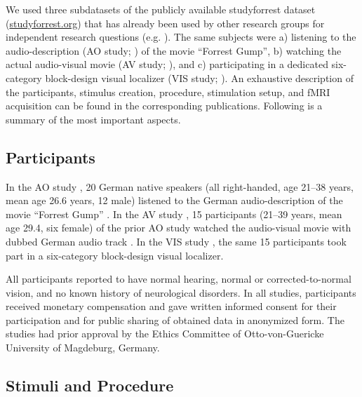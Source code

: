 \documentclass[english]{article}
\begin{document}

We used three subdatasets of the publicly available studyforrest dataset
(\href{http://www.studyforrest.org}{studyforrest.org}) that has already been
used by other research groups for independent research questions
(e.g. \citep{ben2018hippocampal, jiahui2019predicting, hu2017decoding,
lettieri2019emotionotopy, nguyen2016integration}).
The same subjects were
a) listening to the audio-description (AO study; \citep{hanke2014audiomovie}) of
the movie ``Forrest Gump'',
b) watching the actual audio-visual movie (AV study;
\citep{hanke2016simultaneous}), and
c) participating in a dedicated six-category block-design visual localizer (VIS
study; \citep{sengupta2016extension}).
An exhaustive description of the participants, stimulus creation, procedure,
stimulation setup, and fMRI acquisition can be found in the corresponding
publications. Following is a summary of the most important aspects.


\subsection{Participants}
In the AO study \citep{hanke2014audiomovie}, 20 German native speakers (all
right-handed, age 21–38 years, mean age 26.6 years, 12 male) listened to the
German audio-description \citep{ForrestGumpGermanAD} of the movie ``Forrest
Gump'' \citep{ForrestGumpMovie}.
In the AV study \citep{hanke2016simultaneous}, 15 participants (21–39 years,
mean age 29.4, six female) of the prior AO study watched the audio-visual movie
with dubbed German audio track \citep{ForrestGumpDVD}.
In the VIS study \citep{sengupta2016extension}, the same 15 participants took
part in a six-category block-design visual localizer.

All participants reported to have normal hearing, normal or corrected-to-normal
vision, and no known history of neurological disorders.
In all studies, participants received monetary compensation and gave written
informed consent for their participation and for public sharing of obtained data
in anonymized form. The studies had prior approval by the Ethics Committee of
Otto-von-Guericke University of Magdeburg, Germany.


\subsection{Stimuli and Procedure}
\end{document}
